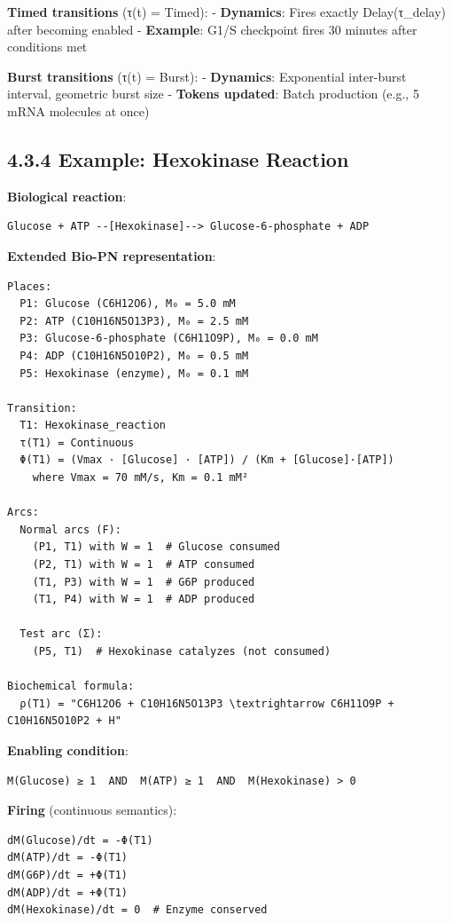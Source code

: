 \textbf{Timed transitions} (τ(t) = Timed): - \textbf{Dynamics}: Fires
exactly Delay(τ\_delay) after becoming enabled - \textbf{Example}: G1/S
checkpoint fires 30 minutes after conditions met

\textbf{Burst transitions} (τ(t) = Burst): - \textbf{Dynamics}:
Exponential inter-burst interval, geometric burst size - \textbf{Tokens
updated}: Batch production (e.g., 5 mRNA molecules at once)

\hypertarget{example-hexokinase-reaction}{%
\subsection{4.3.4 Example: Hexokinase
Reaction}\label{example-hexokinase-reaction}}

\textbf{Biological reaction}:

\begin{lstlisting}
Glucose + ATP --[Hexokinase]--> Glucose-6-phosphate + ADP
\end{lstlisting}

\textbf{Extended Bio-PN representation}:

\begin{lstlisting}
Places:
  P1: Glucose (C6H12O6), M₀ = 5.0 mM
  P2: ATP (C10H16N5O13P3), M₀ = 2.5 mM
  P3: Glucose-6-phosphate (C6H11O9P), M₀ = 0.0 mM
  P4: ADP (C10H16N5O10P2), M₀ = 0.5 mM
  P5: Hexokinase (enzyme), M₀ = 0.1 mM

Transition:
  T1: Hexokinase_reaction
  τ(T1) = Continuous
  Φ(T1) = (Vmax · [Glucose] · [ATP]) / (Km + [Glucose]·[ATP])
    where Vmax = 70 mM/s, Km = 0.1 mM²

Arcs:
  Normal arcs (F):
    (P1, T1) with W = 1  # Glucose consumed
    (P2, T1) with W = 1  # ATP consumed
    (T1, P3) with W = 1  # G6P produced
    (T1, P4) with W = 1  # ADP produced
  
  Test arc (Σ):
    (P5, T1)  # Hexokinase catalyzes (not consumed)

Biochemical formula:
  ρ(T1) = "C6H12O6 + C10H16N5O13P3 \textrightarrow C6H11O9P + C10H16N5O10P2 + H"
\end{lstlisting}

\textbf{Enabling condition}:

\begin{lstlisting}
M(Glucose) ≥ 1  AND  M(ATP) ≥ 1  AND  M(Hexokinase) > 0
\end{lstlisting}

\textbf{Firing} (continuous semantics):

\begin{lstlisting}
dM(Glucose)/dt = -Φ(T1)
dM(ATP)/dt = -Φ(T1)
dM(G6P)/dt = +Φ(T1)
dM(ADP)/dt = +Φ(T1)
dM(Hexokinase)/dt = 0  # Enzyme conserved
\end{lstlisting}

